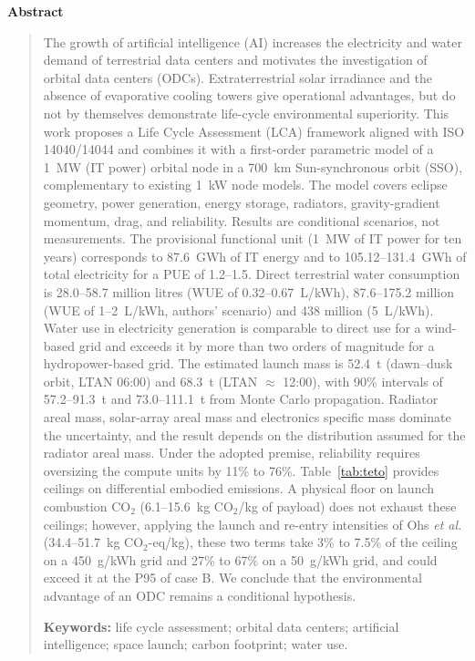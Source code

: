 \documentclass[11pt,a4paper]{article}
\newcommand{\CO}{\ensuremath{\mathrm{CO_2}}}
\newcommand{\COeq}{\ensuremath{\mathrm{CO_2}\text{-eq}}}
\begin{document}
\begin{center}
\textbf{Abstract}
\end{center}
\begin{quote}\small
\noindent
The growth of artificial intelligence (AI) increases the electricity and
water demand of terrestrial data centers and motivates the investigation of
orbital data centers (ODCs). Extraterrestrial solar irradiance and the absence
of evaporative cooling towers give operational advantages, but do not by
themselves demonstrate life-cycle environmental superiority. This work
proposes a Life Cycle Assessment (LCA) framework aligned with ISO
14040/14044 and combines it with a first-order parametric model of a 1~MW (IT
power) orbital node in a 700~km Sun-synchronous orbit (SSO), complementary to
existing 1~kW node models. The model covers eclipse geometry, power
generation, energy storage, radiators, gravity-gradient momentum, drag, and
reliability. Results are conditional scenarios, not measurements. The
provisional functional unit (1~MW of IT power for ten years) corresponds to
87.6~GWh of IT energy and to 105.12--131.4~GWh of total electricity for a PUE
of 1.2--1.5. Direct terrestrial water consumption is 28.0--58.7 million litres
(WUE of 0.32--0.67~L/kWh), 87.6--175.2 million (WUE of 1--2~L/kWh, authors'
scenario) and 438 million (5~L/kWh). Water use in electricity generation is
comparable to direct use for a wind-based grid and exceeds it by more than two
orders of magnitude for a hydropower-based grid. The estimated launch mass is
52.4~t (dawn--dusk orbit, LTAN 06:00) and 68.3~t (LTAN $\approx$ 12:00), with
90\% intervals of 57.2--91.3~t and 73.0--111.1~t from Monte Carlo propagation.
Radiator areal mass, solar-array areal mass and electronics specific mass
dominate the uncertainty, and the result depends on the distribution assumed
for the radiator areal mass. Under the adopted premise, reliability requires
oversizing the compute units by 11\% to 76\%. Table~\ref{tab:teto} provides
ceilings on differential embodied emissions. A physical floor on launch
combustion $\CO$ (6.1--15.6~kg $\CO$/kg of payload) does not exhaust these
ceilings; however, applying the launch and re-entry intensities of Ohs
\emph{et al.} (34.4--51.7~kg $\COeq$/kg), these two terms take 3\% to 7.5\% of
the ceiling on a 450~g/kWh grid and 27\% to 67\% on a 50~g/kWh grid, and could
exceed it at the P95 of case B. We conclude that the environmental advantage of
an ODC remains a conditional hypothesis.

\medskip
\noindent\textbf{Keywords:} life cycle assessment; orbital data centers;
artificial intelligence; space launch; carbon footprint; water use.
\end{quote}
\end{document}
